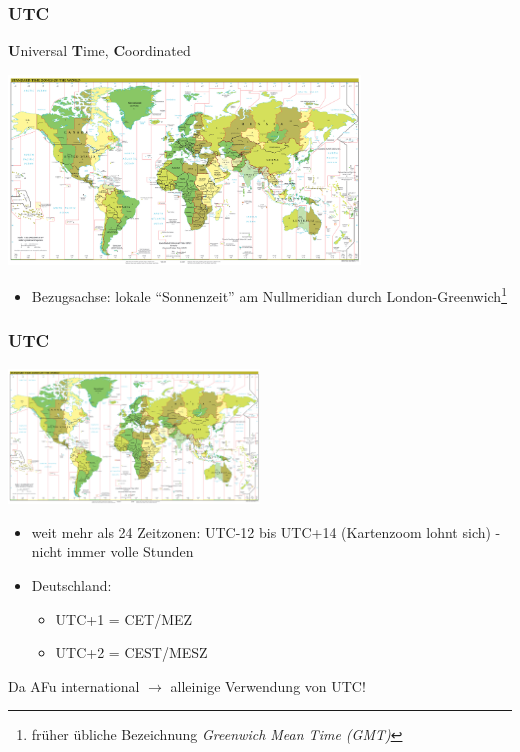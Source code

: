 \begin{frame}
    \frametitle{UTC}

    \textbf{U}niversal \textbf{T}ime, \textbf{C}oordinated

    \begin{center}
        \includegraphics[width=0.7\textwidth]{bv13/Standard_time_zones_of_the_world.png}
        \tiny \hyperlink{refs}{\cite{wc}}
    \end{center}

    \begin{itemize}
        \item Bezugsachse: lokale ``Sonnenzeit'' am Nullmeridian durch
              London-Greenwich\footnote{früher übliche Bezeichnung
              \emph{Greenwich Mean Time (GMT)}}
    \end{itemize}

\end{frame}

\begin{frame}
    \frametitle{UTC}

    \begin{center}
        \includegraphics[width=0.5\textwidth]{bv13/Standard_time_zones_of_the_world.png}
        \tiny \hyperlink{refs}{\cite{wc}}
    \end{center}

    \begin{itemize}
        \item weit mehr als 24 Zeitzonen: UTC-12 bis UTC+14 (Kartenzoom lohnt sich)
              - nicht immer volle Stunden
        \item Deutschland:
        \begin{itemize}
            \item UTC+1 = CET/MEZ
            \item UTC+2 = CEST/MESZ
        \end{itemize}
    \end{itemize}

    Da AFu international $\rightarrow$ alleinige Verwendung von UTC!

\end{frame}

